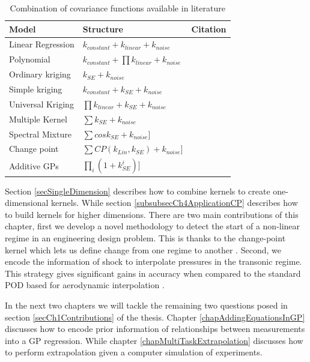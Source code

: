 \begin{table}[!ht]
    \centering
\begin{tabularx}{\textwidth}{|l|l|X|}
  \hline
Model  & Structure & Citation \\
  \hline 
  \hline
Linear Regression & \small $k_{constant}+k_{linear}+k_{noise}$ &  \normalsize\\
Polynomial & \small $k_{constant}+\prod k_{linear}+k_{noise}$ &  \normalsize\\
Ordinary kriging & \small $k_{SE} + k_{noise}$ \normalsize &  \cite{krige1951statistical} \\
Simple kriging & \small $k_{constant}+k_{SE} + k_{noise}$ &  \normalsize\\
Universal Kriging & \small $\prod k_{linear}+k_{SE} + k_{noise}$ \normalsize & \cite{matheron1963principles} \\ Multiple Kernel & \small $\sum k_{SE} + k_{noise}$ \normalsize  &  \\
Spectral Mixture & \small  $\sum cos k_{SE} + k_{noise} ]$ \normalsize & \cite{wilson2013gaussian} \\
Change point & \small  $\sum CP(k_{Lin}, k_{SE}) + k_{noise} ]$ \normalsize & \cite{osborne2010bayesian} \\
Additive GPs & \small  $\prod_{i}(1+k^{i}_{SE}) ]$ \normalsize& \cite{duvenaud2011additive} \normalsize\\
   \hline
\end{tabularx}
  \caption{Combination of covariance functions available in literature}
  \label{tabListOfCombinationOfCovarianceFunctions}
  \end{table}

Section \ref{secSingleDimension} describes how to combine kernels to create one-dimensional kernels. While section \ref{subsubsecCh4ApplicationCP} describes how to build kernels for higher dimensions. There are two main contributions of this chapter, first we develop a novel methodology to detect the start of a non-linear regime in an engineering design problem. This is thanks to the change-point kernel which lets us define change from one regime to another \cite{chiplunkar:hal-01555401}. Second, we encode the information of shock to interpolate pressures in the transonic regime. This strategy gives significant gains in accuracy when compared to the standard POD based for aerodynamic interpolation \cite{oatao18004}. 

In the next two chapters we will tackle the remaining two questions posed in section \ref{secCh1Contributions} of the thesis. Chapter \ref{chapAddingEquationsInGP} discusses how to encode prior information of relationships between measurements into a GP regression. While chapter \ref{chapMultiTaskExtrapolation} discusses how to perform extrapolation given a computer simulation of experiments. 
